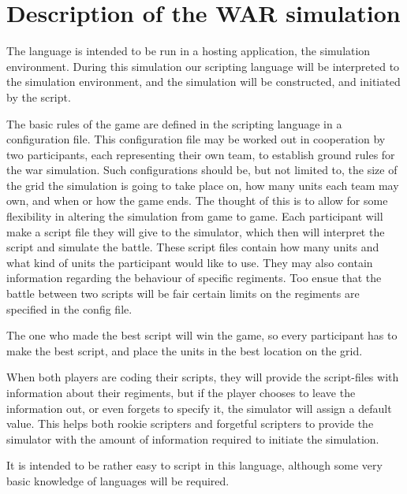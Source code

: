 
\section{ Description of the WAR simulation }

	The language is intended to be run in a hosting application, the simulation environment. During this simulation our scripting language will be interpreted to the simulation environment, and the simulation will be constructed, and initiated by the script.
	
	The basic rules of the game are defined in the scripting language in a configuration file. This configuration file may be worked out in cooperation by two participants, each representing their own team, to establish ground rules for the war simulation. Such configurations should be, but not limited to, the size of the grid the simulation is going to take place on, how many units each team may own, and when or how the game ends.
	The thought of this is to allow for some flexibility in altering the simulation from game to game.
	Each participant will make a script file they will give to the simulator, 
	which then will interpret the script and simulate the battle. 
	These script files contain how many units and what kind of units the participant would like to use. They may also contain information regarding the behaviour of specific regiments. Too ensue that the battle between two scripts will be fair certain limits on the regiments are specified in the config file.

	The one who made the best script will win the game, so every participant has to make the best script, 
	and place the units in the best location on the grid.

When both players are coding their scripts, they will provide the script-files with information about their regiments, but if the player chooses to leave the information out, or even forgets to specify it, the simulator will assign a default value. This helps both rookie scripters and forgetful scripters to provide the simulator with the amount of information required to initiate the simulation.

It is intended to be rather easy to script in this language, although some very basic knowledge of languages will be required.


